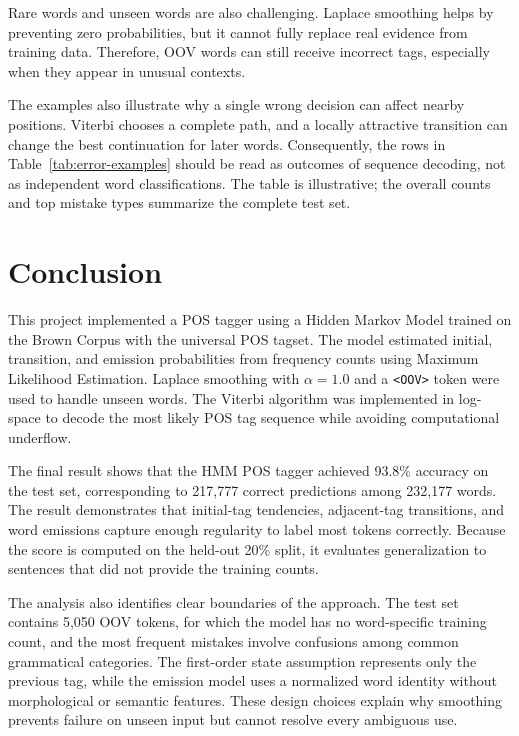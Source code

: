 \documentclass[12pt,a4paper]{article}
\newcommand{\sectionbreakguard}{\Needspace{8\baselineskip}}
\begin{document}
Rare words and unseen words are also challenging. Laplace smoothing helps by
preventing zero probabilities, but it cannot fully replace real evidence from
training data. Therefore, OOV words can still receive incorrect tags, especially
when they appear in unusual contexts.

The examples also illustrate why a single wrong decision can affect nearby
positions. Viterbi chooses a complete path, and a locally attractive transition
can change the best continuation for later words. Consequently, the rows in
Table~\ref{tab:error-examples} should be read as outcomes of sequence decoding,
not as independent word classifications. The table is illustrative; the overall
counts and top mistake types summarize the complete test set.

\sectionbreakguard
\section{Conclusion}

This project implemented a POS tagger using a Hidden Markov Model trained on the
Brown Corpus with the universal POS tagset. The model estimated initial,
transition, and emission probabilities from frequency counts using Maximum
Likelihood Estimation. Laplace smoothing with $\alpha = 1.0$ and a
\texttt{\textless OOV\textgreater} token were used to handle unseen words. The
Viterbi algorithm was implemented in log-space to decode the most likely POS tag
sequence while avoiding computational underflow.

The final result shows that the HMM POS tagger achieved 93.8\% accuracy on the
test set, corresponding to 217,777 correct predictions among 232,177 words. The
result demonstrates that initial-tag tendencies, adjacent-tag transitions, and
word emissions capture enough regularity to label most tokens correctly. Because
the score is computed on the held-out 20\% split, it evaluates generalization to
sentences that did not provide the training counts.

The analysis also identifies clear boundaries of the approach. The test set
contains 5,050 OOV tokens, for which the model has no word-specific training
count, and the most frequent mistakes involve confusions among common grammatical
categories. The first-order state assumption represents only the previous tag,
while the emission model uses a normalized word identity without morphological
or semantic features. These design choices explain why smoothing prevents
failure on unseen input but cannot resolve every ambiguous use.
\end{document}
